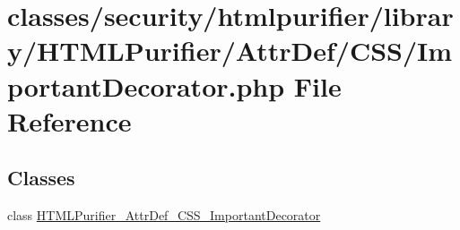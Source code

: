 \hypertarget{ImportantDecorator_8php}{\section{classes/security/htmlpurifier/library/\+H\+T\+M\+L\+Purifier/\+Attr\+Def/\+C\+S\+S/\+Important\+Decorator.php File Reference}
\label{ImportantDecorator_8php}
}
\subsection*{Classes}
\begin{DoxyCompactItemize}
\item 
class \hyperlink{classHTMLPurifier__AttrDef__CSS__ImportantDecorator}{H\+T\+M\+L\+Purifier\+\_\+\+Attr\+Def\+\_\+\+C\+S\+S\+\_\+\+Important\+Decorator}
\end{DoxyCompactItemize}
